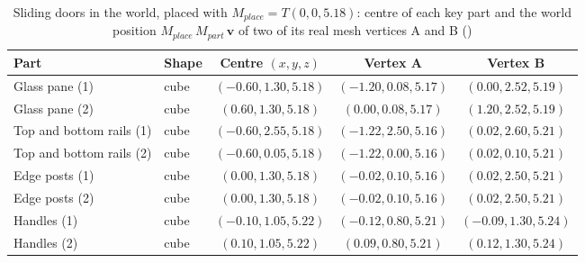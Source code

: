 \begin{table}[H]\centering\footnotesize
\caption{Sliding doors in the world, placed with $M_{place}=T(0, 0, 5.18)$: centre of each key part and the world position $M_{place}\,M_{part}\,\mathbf{v}$ of two of its real mesh vertices A and B ()}\label{tab:world_doors}
\begin{tabular}{@{}l l c c c@{}}
\toprule
Part & Shape & Centre $(x,y,z)$ & Vertex A & Vertex B \\
\midrule
Glass pane (1) & cube & $(-0.60, 1.30, 5.18)$ & $(-1.20, 0.08, 5.17)$ & $(0.00, 2.52, 5.19)$ \\
Glass pane (2) & cube & $(0.60, 1.30, 5.18)$ & $(0.00, 0.08, 5.17)$ & $(1.20, 2.52, 5.19)$ \\
Top and bottom rails (1) & cube & $(-0.60, 2.55, 5.18)$ & $(-1.22, 2.50, 5.16)$ & $(0.02, 2.60, 5.21)$ \\
Top and bottom rails (2) & cube & $(-0.60, 0.05, 5.18)$ & $(-1.22, 0.00, 5.16)$ & $(0.02, 0.10, 5.21)$ \\
Edge posts (1) & cube & $(0.00, 1.30, 5.18)$ & $(-0.02, 0.10, 5.16)$ & $(0.02, 2.50, 5.21)$ \\
Edge posts (2) & cube & $(0.00, 1.30, 5.18)$ & $(-0.02, 0.10, 5.16)$ & $(0.02, 2.50, 5.21)$ \\
Handles (1) & cube & $(-0.10, 1.05, 5.22)$ & $(-0.12, 0.80, 5.21)$ & $(-0.09, 1.30, 5.24)$ \\
Handles (2) & cube & $(0.10, 1.05, 5.22)$ & $(0.09, 0.80, 5.21)$ & $(0.12, 1.30, 5.24)$ \\
\bottomrule
\end{tabular}
\end{table}
